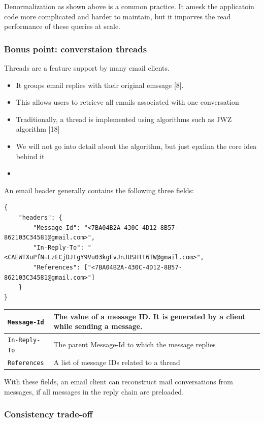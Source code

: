 \documentclass{report}
\theoremstyle{definition}
\let\oldsubsubsection\subsubsection
\renewcommand{\subsubsection}{\oldsubsubsection*}
\begin{document}
Denormalization as shown above is a common practice. It amesk the applicatoin code more complicated and harder to maintain, but it imporves the read performance of these queries at scale.

\subsubsection{Bonus point: converstaion threads}

Threads are a feature support by many email clients.

\begin{itemize}
\item
It groups email replies with their original emssage [8].
\item
This allows users to retrieve all emails associated with one conversation
\item
Traditionally, a thread is implemented using algorithms such as JWZ algorithm [18]
\item
We will not go into detail about the algorithm, but just epxlina the core idea behind it
\item
\end{itemize}

An email header generally contains the following three fields:

\begin{lstlisting}
{
    "headers": {
        "Message-Id": "<7BA04B2A-430C-4D12-8B57-862103C34581@gmail.com>",
        "In-Reply-To": "<CAEWTXuPfN=LzECjDJtgY9Vu03kgFvJnJUSHTt6TW@gmail.com>",
        "References": ["<7BA04B2A-430C-4D12-8B57-862103C34581@gmail.com>"]
    }
}
\end{lstlisting}

\begin{tabular}{|p{6cm}|p{6cm}|}
\hline
\lstinline|Message-Id| & The value of a message ID. It is generated by a client while sending a message. \\
\hline
\lstinline|In-Reply-To| & The parent Message-Id to which the message replies \\
\hline
\lstinline|References| & A list of message IDs related to a thread\\
\hline
\end{tabular}

With these fields, an email client can reconstruct mail conversations from messages, if all messages in the reply chain are preloaded.

\subsubsection{Consistency trade-off}
\end{document}
